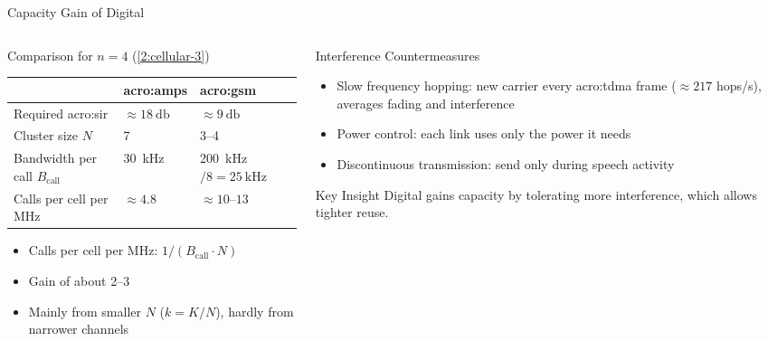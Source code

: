 \begin{frame}{Capacity Gain of Digital}
  \begin{columns}[T,onlytextwidth]
    \begin{column}{0.56\textwidth}
      Comparison for $n = 4$ (\cref{2:cellular-3})

      \centering
      \footnotesize
      \begin{tabular}{lll}
        \toprule
        & \textbf{\acrshort{acro:amps}} & \textbf{\acrshort{acro:gsm}} \\
        \midrule
        Required \acrshort{acro:sir} & $\approx\qty{18}{\decibel}$ & $\approx\qty{9}{\decibel}$ \\
        Cluster size $N$ & 7 & 3--4 \\
        Bandwidth per call $B_\text{call}$ & \qty{30}{\kilo\hertz} & \qty{200}{\kilo\hertz}$/8 = \qty{25}{\kilo\hertz}$ \\
        Calls per cell per \unit{\mega\hertz} & $\approx 4.8$ & $\approx 10$--$13$ \\
        \bottomrule
      \end{tabular}

      \normalsize
      \raggedright
      \begin{itemize}
        \item Calls per cell per \unit{\mega\hertz}: $1/(B_\text{call} \cdot N)$
        \item Gain of about 2--3
        \item Mainly from smaller $N$ ($k = K/N$), hardly from narrower channels
      \end{itemize}
    \end{column}
    \begin{column}{0.40\textwidth}
      \begin{block}{Interference Countermeasures}
        \begin{itemize}
          \item Slow frequency hopping: new carrier every \gls{acro:tdma} frame ($\approx 217$ hops/s), averages fading and interference~\cite{etsi.145.001.v18}
          \item Power control: each link uses only the power it needs
          \item Discontinuous transmission: send only during speech activity
        \end{itemize}
      \end{block}
      \begin{alertblock}{Key Insight}
        Digital gains capacity by tolerating more interference, which allows tighter reuse.
      \end{alertblock}
    \end{column}
  \end{columns}
\end{frame}

